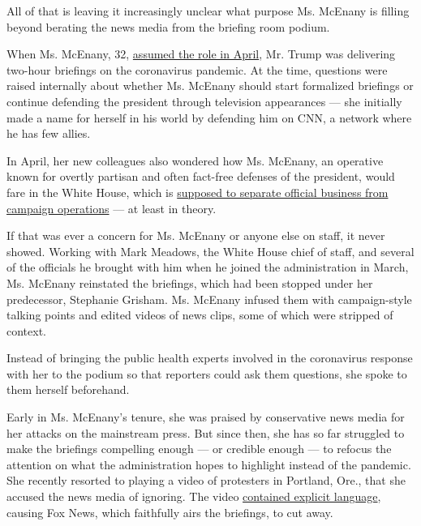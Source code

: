 All of that is leaving it increasingly unclear what purpose Ms. McEnany
is filling beyond berating the news media from the briefing room podium.

When Ms. McEnany, 32,
\href{https://www.nytimes3xbfgragh.onion/2020/04/07/us/politics/kayleigh-mcenany-stephanie-grisham-trump.html}{assumed
the role in April}, Mr. Trump was delivering two-hour briefings on the
coronavirus pandemic. At the time, questions were raised internally
about whether Ms. McEnany should start formalized briefings or continue
defending the president through television appearances --- she initially
made a name for herself in his world by defending him on CNN, a network
where he has few allies.

In April, her new colleagues also wondered how Ms. McEnany, an operative
known for overtly partisan and often fact-free defenses of the
president, would fare in the White House, which is
\href{https://www.nytimes3xbfgragh.onion/2020/07/16/us/politics/trump-goya-ivanka.html}{supposed
to separate official business from campaign operations} --- at least in
theory.

If that was ever a concern for Ms. McEnany or anyone else on staff, it
never showed. Working with Mark Meadows, the White House chief of staff,
and several of the officials he brought with him when he joined the
administration in March, Ms. McEnany reinstated the briefings, which had
been stopped under her predecessor, Stephanie Grisham. Ms. McEnany
infused them with campaign-style talking points and edited videos of
news clips, some of which were stripped of context.

Instead of bringing the public health experts involved in the
coronavirus response with her to the podium so that reporters could ask
them questions, she spoke to them herself beforehand.

Early in Ms. McEnany's tenure, she was praised by conservative news
media for her attacks on the mainstream press. But since then, she has
so far struggled to make the briefings compelling enough --- or credible
enough --- to refocus the attention on what the administration hopes to
highlight instead of the pandemic. She recently resorted to playing a
video of protesters in Portland, Ore., that she accused the news media
of ignoring. The video
\href{https://twitter.com/alexnazaryan/status/1286718175506178048?ref_src=twsrc\%5Etfw\%7Ctwcamp\%5Etweetembed\%7Ctwterm\%5E1286718175506178048\%7Ctwgr\%5E\&ref_url=https\%3A\%2F\%2Fwww.businessinsider.com\%2Ffox-news-cut-away-from-disturbing-portland-video-wh-briefing-2020-7}{contained
explicit language}, causing Fox News, which faithfully airs the
briefings, to cut away.

